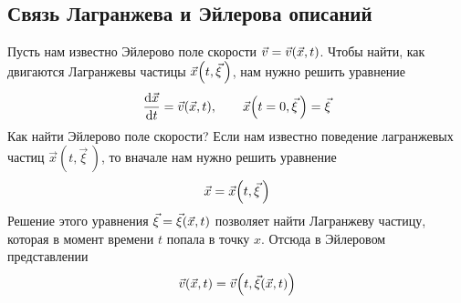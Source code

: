 \subsection{Связь Лагранжева и Эйлерова описаний}
Пусть нам известно Эйлерово поле скорости $ \vec{v}=\vec{v}\qty(\vec{x}, t) $. Чтобы найти, как двигаются Лагранжевы частицы $ \vec{x}\qty(t, \vec{\xi}\,) $, нам нужно решить уравнение
\begin{align*} 
\dv{\vec{x}}{t}=\vec{v}\qty(\vec{x}, t), \qquad
\vec{x}\qty(t=0, \vec{\xi}\,)=\vec{\xi}
\end{align*}
Как найти Эйлерово поле скорости? Если нам известно поведение лагранжевых частиц $ \vec{x}(t, \vec{\xi}\,) $, то вначале нам нужно решить уравнение 
\begin{align*} 
\vec{x}=\vec{x}\qty(t, \vec{\xi}\,)
\end{align*}
Решение этого уравнения $\vec{\xi}=\vec{\xi}\qty(\vec{x}, t)$
позволяет найти Лагранжеву частицу, которая в момент времени $t$ попала в точку $x$. Отсюда в Эйлеровом представлении
\begin{align*} 
\vec{v}(\vec{x}, t)=\vec{v}\qty(t, \vec{\xi}(\vec{x}, t))
\end{align*}




